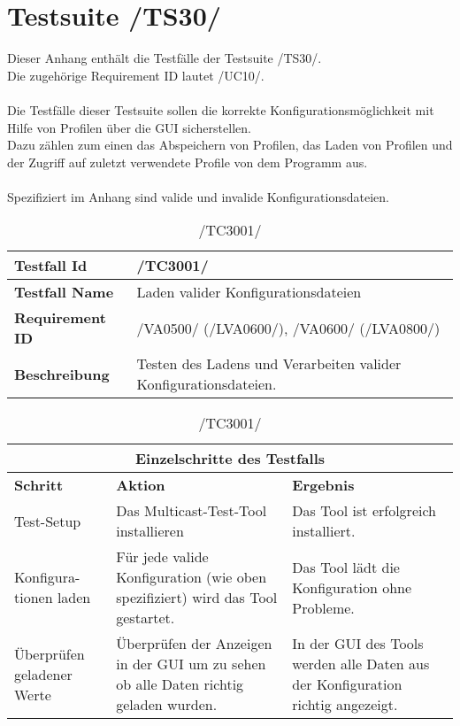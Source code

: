 \chapter{Testsuite /TS30/}

Dieser Anhang enthält die Testfälle der Testsuite /TS30/.\\
Die zugehörige Requirement ID lautet /UC10/.\\
\\
Die Testfälle dieser Testsuite sollen die korrekte Konfigurationsmöglichkeit mit Hilfe von Profilen über die GUI sicherstellen.\\
Dazu zählen zum einen das Abspeichern von Profilen, das Laden von Profilen und der Zugriff auf zuletzt verwendete Profile von dem Programm aus.\\
\\
Spezifiziert im Anhang sind valide und invalide Konfigurationsdateien.

\begin{table}[h]
\caption{/TC3001/}
\label{tab:TC3001}
\begin{center}
\begin{tabular}{|p{3.5cm}|p{9cm}|}
\hline
\textbf{Testfall Id} & /TC3001/\\
\hline
\textbf{Testfall Name} & Laden valider Konfigurationsdateien \\
\hline
\textbf{Requirement ID} & /VA0500/ (/LVA0600/), /VA0600/ (/LVA0800/) \\
\hline
\textbf{Beschreibung} & Testen des Ladens und Verarbeiten valider Konfigurationsdateien. \\
\hline
\end{tabular}
\begin{tabular}{|p{2.5cm}|p{5cm}|p{4.55cm}|}
\multicolumn{3}{|c|}{\textbf{Einzelschritte des Testfalls}} \\
\hline
\textbf{Schritt} & \textbf{Aktion} & \textbf{Ergebnis}\\
\hline
Test-Setup & Das Multicast-Test-Tool installieren & Das Tool ist erfolgreich
installiert. \\
\hline
Konfigura- tionen laden & Für jede valide Konfiguration (wie oben spezifiziert) wird das Tool gestartet. & Das Tool lädt die Konfiguration ohne Probleme. \\
\hline
Überprüfen geladener Werte & Überprüfen der Anzeigen in der GUI um zu sehen ob alle Daten richtig geladen wurden. & In der GUI des Tools werden alle Daten aus der Konfiguration richtig angezeigt. \\
\hline
\end{tabular}
\end{center}
\label{default}
\end{table}

